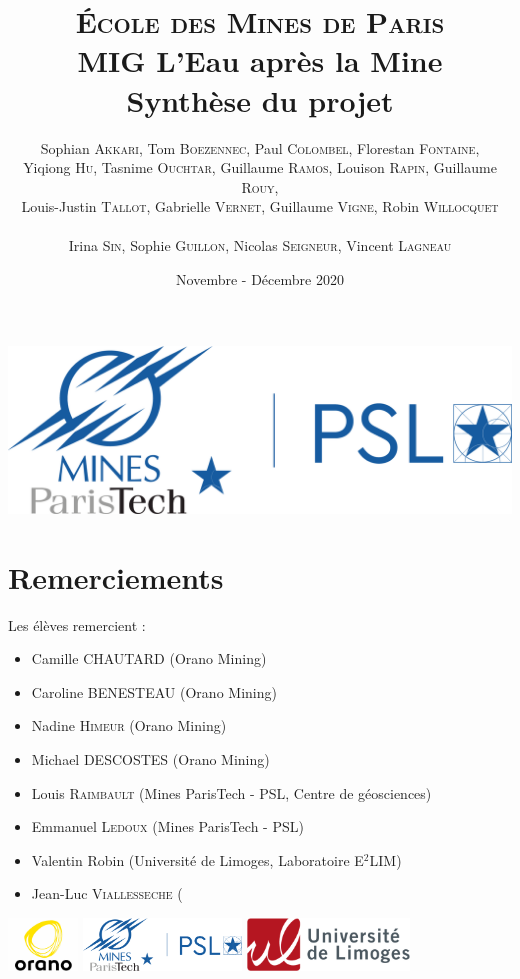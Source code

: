\documentclass{article}
\title{\textbf{\LARGE{\textsc{École des Mines de Paris}}\\ \vspace{1 cm}MIG L'Eau après la Mine\\\vspace{0.8 cm}Synthèse du projet}\vspace{1 cm}}
\author{Sophian \textsc{Akkari}, Tom \textsc{Boezennec}, Paul \textsc{Colombel}, Florestan \textsc{Fontaine},\\ Yiqiong \textsc{Hu}, Tasnime \textsc{Ouchtar}, Guillaume \textsc{Ramos}, Louison \textsc{Rapin}, Guillaume \textsc{Rouy},\\ Louis-Justin \textsc{Tallot}, Gabrielle \textsc{Vernet}, Guillaume \textsc{Vigne}, Robin \textsc{Willocquet}\\ \\ Irina \textsc{Sin}, Sophie \textsc{Guillon}, Nicolas \textsc{Seigneur}, Vincent \textsc{Lagneau}}
\date{\vspace{2 cm}Novembre - Décembre 2020}
\begin{document}

\maketitle
\thispagestyle{empty}
\vspace{2 cm}
\begin{center}
    \includegraphics[width = 0.4\linewidth]{logoMPT.png}
\end{center}
\newpage
{}
\section*{Remerciements}

Les élèves remercient : 
\begin{itemize}
    \item Camille \textsc{CHAUTARD} (Orano Mining)
    \item Caroline \textsc{BENESTEAU} (Orano Mining)
    \item Nadine \textsc{Himeur} (Orano Mining)
    \item Michael \textsc{DESCOSTES} (Orano Mining) 
    \item Louis \textsc{Raimbault} (Mines ParisTech - PSL, Centre de géosciences) 
    \item  Emmanuel \textsc{Ledoux} (Mines ParisTech - PSL)
    \item Valentin Robin (Université de Limoges, Laboratoire E$^2$LIM) 
    \item Jean-Luc \textsc{Viallesseche} (
\end{itemize}
\includegraphics[height = 40pt]{oranologo.png} \includegraphics[height = 40pt ]{logoMPT.png}
\includegraphics[height = 40pt ]{logoUNILIM.png}
\newpage
{}
\tableofcontents
\end{document}
